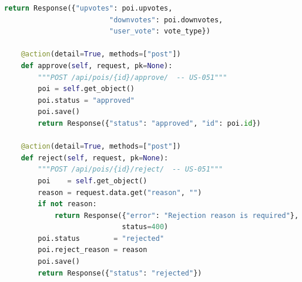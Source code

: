 \begin{lstlisting}[language=Python]
        return Response({"upvotes": poi.upvotes,
                         "downvotes": poi.downvotes,
                         "user_vote": vote_type})

    @action(detail=True, methods=["post"])
    def approve(self, request, pk=None):
        """POST /api/pois/{id}/approve/  -- US-051"""
        poi = self.get_object()
        poi.status = "approved"
        poi.save()
        return Response({"status": "approved", "id": poi.id})

    @action(detail=True, methods=["post"])
    def reject(self, request, pk=None):
        """POST /api/pois/{id}/reject/  -- US-051"""
        poi    = self.get_object()
        reason = request.data.get("reason", "")
        if not reason:
            return Response({"error": "Rejection reason is required"},
                            status=400)
        poi.status        = "rejected"
        poi.reject_reason = reason
        poi.save()
        return Response({"status": "rejected"})
\end{lstlisting}
